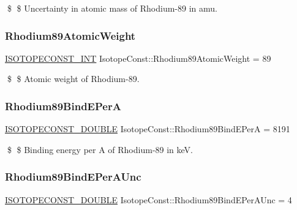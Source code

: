 \$ \$ Uncertainty in atomic mass of Rhodium-\/89 in amu. \mbox{\label{group___isotope_const-_rhodium-_rh89_ga739f8b05bee0ba901ec628769b974f02}} 
\subsubsection{\texorpdfstring{Rhodium89\+Atomic\+Weight}{Rhodium89AtomicWeight}}
{\footnotesize\ttfamily \mbox{\hyperlink{group___isotope_const-_macros_ga5f18360b3e99483a35c32d789e62621c}{I\+S\+O\+T\+O\+P\+E\+C\+O\+N\+S\+T\+\_\+\+I\+NT}} Isotope\+Const\+::\+Rhodium89\+Atomic\+Weight = 89}

\$ \$ Atomic weight of Rhodium-\/89. \mbox{\label{group___isotope_const-_rhodium-_rh89_ga6b69c510761202360de8bf5d3eef2753}} 
\subsubsection{\texorpdfstring{Rhodium89\+Bind\+E\+PerA}{Rhodium89BindEPerA}}
{\footnotesize\ttfamily \mbox{\hyperlink{group___isotope_const-_macros_ga8f45a7272ce02c0b4c65c44636ed719a}{I\+S\+O\+T\+O\+P\+E\+C\+O\+N\+S\+T\+\_\+\+D\+O\+U\+B\+LE}} Isotope\+Const\+::\+Rhodium89\+Bind\+E\+PerA = 8191}

\$ \$ Binding energy per A of Rhodium-\/89 in keV. \mbox{\label{group___isotope_const-_rhodium-_rh89_gac68d51716374b2ae3fed0b68ab6a40f0}} 
\subsubsection{\texorpdfstring{Rhodium89\+Bind\+E\+Per\+A\+Unc}{Rhodium89BindEPerAUnc}}
{\footnotesize\ttfamily \mbox{\hyperlink{group___isotope_const-_macros_ga8f45a7272ce02c0b4c65c44636ed719a}{I\+S\+O\+T\+O\+P\+E\+C\+O\+N\+S\+T\+\_\+\+D\+O\+U\+B\+LE}} Isotope\+Const\+::\+Rhodium89\+Bind\+E\+Per\+A\+Unc = 4}

